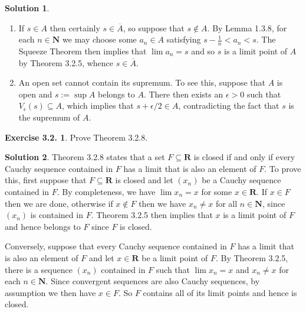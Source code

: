 \documentclass[12pt]{article}
\theoremstyle{definition}
\theoremstyle{exercise}
\newtheorem{exercise}{Exercise 3.2.}
\theoremstyle{solution}
\newtheorem*{solution}{Solution}
\newcommand{\N}{\mathbf{N}}
\newcommand{\R}{\mathbf{R}}
\begin{document}
\begin{solution}
    \begin{enumerate}
        \item If \( s \in A \) then certainly \( s \in \overline{A} \), so suppose that \( s \not\in A \). By Lemma 1.3.8, for each \( n \in \N \) we may choose some \( a_n \in A \) satisfying \( s - \tfrac{1}{n} < a_n < s \). The Squeeze Theorem then implies that \( \lim a_n = s \) and so \( s \) is a limit point of \( A \) by Theorem 3.2.5, whence \( s \in \overline{A} \).

        \item An open set cannot contain its supremum. To see this, suppose that \( A \) is open and \( s := \sup A \) belongs to \( A \). There then exists an \( \epsilon > 0 \) such that \( V_{\epsilon}(s) \subseteq A \), which implies that \( s + \epsilon / 2 \in A \), contradicting the fact that \( s \) is the supremum of \( A \).
    \end{enumerate}
\end{solution}

\begin{exercise}
\label{ex:5}
    Prove Theorem 3.2.8.
\end{exercise}

\begin{solution}
    Theorem 3.2.8 states that a set \( F \subseteq \R \) is closed if and only if every Cauchy sequence contained in \( F \) has a limit that is also an element of \( F \). To prove this, first suppose that \( F \subseteq \R \) is closed and let \( (x_n) \) be a Cauchy sequence contained in \( F \). By completeness, we have \( \lim x_n = x \) for some \( x \in \R \). If \( x \in F \) then we are done, otherwise if \( x \not\in F \) then we have \( x_n \neq x \) for all \( n \in \N \), since \( (x_n) \) is contained in \( F \). Theorem 3.2.5 then implies that \( x \) is a limit point of \( F \) and hence belongs to \( F \) since \( F \) is closed.

    Conversely, suppose that every Cauchy sequence contained in \( F \) has a limit that is also an element of \( F \) and let \( x \in \R \) be a limit point of \( F \). By Theorem 3.2.5, there is a sequence \( (x_n) \) contained in \( F \) such that \( \lim x_n = x \) and \( x_n \neq x \) for each \( n \in \N \). Since convergent sequences are also Cauchy sequences, by assumption we then have \( x \in F \). So \( F \) contains all of its limit points and hence is closed.
\end{solution}
\end{document}
